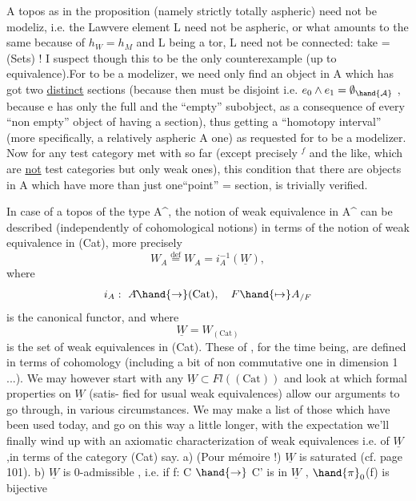 
A topos  as in the proposition (namely strictly totally aspheric)
need not be  modeliz, i.e.  the Lawvere element L need not
be aspheric, or what amounts to the same because of $h_W = h_M$ and L being
 a tor, L need not be connected: take  = (Sets) ! I suspect
 though this to be the only counterexample (up to equivalence)\hand{(*)}.For  to
be a modelizer, we need only find an object in A which has got two
\uline{distinct} sections (because then  must be disjoint i.e. $e_0 \wedge e_1 = \emptyset_{\hand{\mathcal{A}}}$ ,
because e has only the full and the ``empty'' subobject, as a consequence
of every ``non empty'' object of  having a section), thus getting a
``homotopy interval'' (more specifically, a  relatively aspheric  A one)
as requested for  to be a modelizer. Now for any  test category met
with so far (except precisely \hand{$\Delta$}$^f$ and the like, which are  \uline{not}
test categories but only weak ones), this condition that there are objects
in A which have more than just one``point'' \hand{(}= section\hand{)}, is trivially
verified.

In case of a topos of the type A\^{}, the notion of weak equivalence in
A\^{} can be described (independently of cohomological notions) in terms of
the notion of weak equivalence in (Cat), more precisely
\[ W_A \overset{\text{def}}{=} W_{A\hat{}} = i_A^{-1}(\underline{W}) , \]
where
\[ i_A :\ A\hat{} \hand{\to} (\mathrm{Cat}) , \quad F \hand{\mapsto} A_{/F} \]
is the canonical functor, and where
\[ \underline{W} = W_{(\mathrm{Cat})} \]
is the set of weak equivalences in (Cat). These of , for the time
being, are defined in terms of  cohomology (including
a bit of non commutative one in dimension 1 ...). We may however start
with any $\underline{W} \subset Fl((\mathrm{Cat}))$ and look at which formal properties on $\underline{W}$ (satis-%
fied for usual weak equivalences) allow our arguments to go through, in
various circumstances. We may make a list of those which have been used
today, and go on this way a little longer, with the expectation we'll
finally wind up with an axiomatic characterization of weak equivalences
i.e. of $\underline{W}$,in terms of the category (Cat)\xout{,} say.
a) (Pour mémoire !) $\underline{W}$ is saturated (cf. page 101).
b) $\underline{W}$ is 0-admissible , i.e. if f: C $\hand{\to}$ C' is in $\underline{W}$ , $\hand{\pi}_0$(f) is bijective

